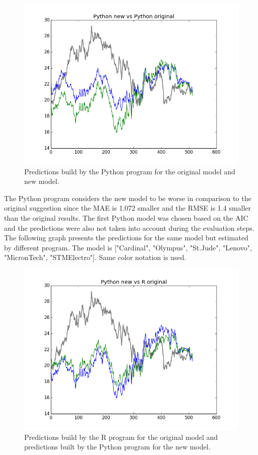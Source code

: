 \documentclass[
  twoside,
  11pt, a4paper,
  footinclude=true,
  headinclude=true,
  cleardoublepage=empty
]{scrreprt}
\begin{document}
    \begin{figure}[H]
        \includegraphics[scale=0.5]{PythonOriginalVsPythonNew.png}
        \centering
        \caption{Predictions build by the Python program for the original model and new model.}
        \label{fig:PythonOriginalVsPythonNew}
    \end{figure}
    
    The Python program considers the new model to be worse in comparison to the original suggestion since the MAE is 1.072 smaller and the RMSE is 1.4 smaller than the original results. The first Python model was chosen based on the AIC and the predictions were also not taken into account during the evaluation steps.\\
    The following graph presents the predictions for the same model but estimated by different program. The model is ["Cardinal", "Olympus", "St.Jude", "Lenovo", "MicronTech", "STMElectro"]. Same color notation is used.
    
    \begin{figure}[H]
        \includegraphics[scale=0.5]{ROriginalVsPythonNew.png}
        \centering
        \caption{Predictions build by the R program for the original model and predictions built by the Python program for the new model.}
        \label{fig:ROriginalVsPythonNew}
    \end{figure}
    
\end{document}
